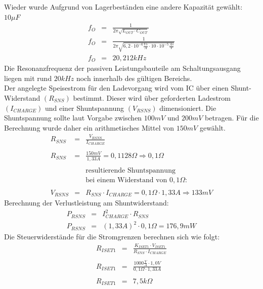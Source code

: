 \documentclass[12pt]{scrreprt} %
\begin{document}
Wieder wurde Aufgrund von Lagerbeständen eine andere Kapazität gewählt: $10 \mu F$ 
\begin{eqnarray}
f_O&=&\frac{1}{2 \pi \sqrt{L_{OUT} \cdot C_{OUT}}}\\
f_O&=&\frac{1}{2 \pi \sqrt{6,2 \cdot 10^{-6} \frac{Vs}{A} \cdot 10 \cdot 10^{-5} \frac{As}{V}}}\\
f_O&=& 20,212kHz
\end{eqnarray}
Die Resonanzfrequenz der passiven Leistungsbauteile am Schaltungsausgang liegen mit rund $20kHz$ noch innerhalb des gültigen Bereichs.\\
Der angelegte Speisestrom für den Ladevorgang wird vom IC über einen Shunt-Widerstand $\left( R_{SNS} \right)$ bestimmt. Dieser wird über geforderten Ladestrom $\left( I_{CHARGE} \right)$ und einer Shuntspannung $\left( V_{RSNS} \right)$ dimensioniert. Die Shuntspannung sollte laut Vorgabe zwischen $100mV$ und $200mV$ betragen. Für die Berechnung wurde daher ein arithmetisches Mittel von $150mV$ gewählt.
\begin{eqnarray}
R_{SNS}&=&\frac{V_{RSNS}}{I_{CHARGE}}\\
\nonumber\\
R_{SNS}&=&\frac{150mV}{1,33A} = 0,1128 \Omega \Rightarrow 0,1 \Omega \\
\nonumber\\
&&\textrm{resultierende Shuntspannung} \nonumber \\
&&\textrm{bei einem Widerstand von } 0,1 \Omega : \nonumber \\
\nonumber\\
V_{RSNS}&=&R_{SNS} \cdot I_{CHARGE} = 0,1 \Omega \cdot 1,33A \Rightarrow 133mV
\end{eqnarray}
Berechnung der Verlustleistung am Shuntwiderstand:
\begin{eqnarray}
P_{RSNS}&=& I_{CHARGE}^2 \cdot R_{SNS}\\
P_{RSNS}&=& \left( 1,33A \right)^2 \cdot 0,1 \Omega = 176,9mW
\end{eqnarray}
Die Steuerwiderstände für die Stromgrenzen berechnen sich wie folgt:
\begin{eqnarray}
R_{ISET1}&=&\frac{K_{ISET1} \cdot V_{ISET1}}{R_{SNS} \cdot I_{CHARGE}}\\
 \nonumber \\
R_{ISET1}&=&\frac{1000 \frac{V}{A} \cdot 1,0V}{0,1\Omega \cdot 1,33A}\\
 \nonumber \\
R_{ISET1}&=&7,5k\Omega
\end{eqnarray}
\end{document}
